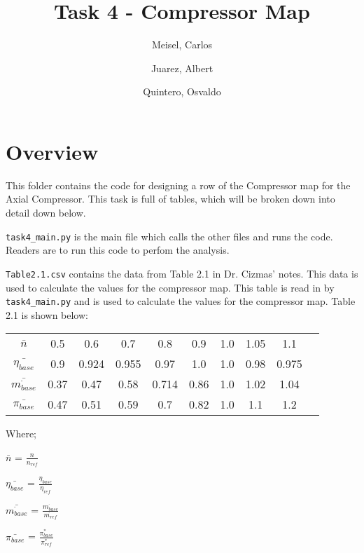 \documentclass[12pt,english]{article}
\author{
    Meisel, Carlos \\
  \and
  Juarez, Albert\\
  \and
    Quintero, Osvaldo\\
}
\title{Task 4 - Compressor Map}
\begin{document}
  \maketitle

\section*{Overview}
This folder contains the code for designing a row of the Compressor map for the Axial Compressor. This task is full of tables, which will be broken down into detail down below.

\vspace*{3pt}

\verb|task4_main.py| is the main file which calls the other files and runs the code. Readers are to run this code to perfom the analysis.

\vspace*{3pt}

\verb|Table2.1.csv| contains the data from Table 2.1 in Dr. Cizmas' notes. This data is used to calculate the values for the compressor map. This table is read in by \verb|task4_main.py| and is used to calculate the values for the compressor map. Table 2.1 is shown below:


\begin{center}
    \begin{tabular}{ c c c c c c c c c c }
     $\bar{n}$ & 0.5 & 0.6 & 0.7 & 0.8 & 0.9 & 1.0 & 1.05 & 1.1 \\ 
        $\bar{\eta_{base}}$ & 0.9 & 0.924 & 0.955 & 0.97 & 1.0 & 1.0 & 0.98 & 0.975 \\
        $\bar{\dot{m_{base}}}$ & 0.37 & 0.47 & 0.58 & 0.714 & 0.86 & 1.0 & 1.02 & 1.04 \\
        $\bar{\pi_{base}}$ & 0.47 & 0.51 & 0.59 & 0.7 & 0.82 & 1.0 & 1.1 & 1.2 \\
    \end{tabular}
    \end{center}

\vspace*{3pt}

Where; 
\begin{center}
    $\bar{n}$ = $\frac{n}{n_{ref}}$ 

    \vspace*{3pt}

    $\bar{\eta_{base}}$ = $\frac{\eta_{base}}{\eta_{ref}}$
    
    \vspace*{3pt}
    
    $\bar{\dot{m_{base}}}$ = $\frac{\dot{m_{base}}}{\dot{m_{ref}}}$
    
    \vspace*{3pt}
    
    $\bar{\pi_{base}}$ = $\frac{\pi^* _{base}}{\pi^* _{ref}}$
\end{center}
\end{document}
